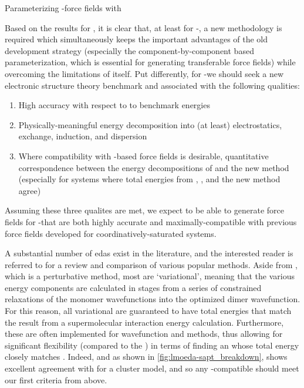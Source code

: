 \begin{section}{Parameterizing \cus-\mof force fields with \lmoeda}
\label{sec:lmoeda-theory}

Based on the results for \mgmof, it is clear that, at least for \cus-\mofs, a
new methodology is required which simultaneously keeps the important advantages of the
old development strategy (especially the component-by-component based parameterization,
which is essential for generating transferable force fields) while overcoming
the limitations of \sapt itself. Put differently, for \cus-\mofs we should
seek a new electronic structure theory benchmark and associated \eda 
with the following qualities:
%
\begin{enumerate}
\item High accuracy with respect to to \ccsdtf benchmark energies
\item Physically-meaningful energy decomposition into (at least)
electrostatics, exchange, induction, and dispersion
\item Where compatibility with \sapt-based force fields is desirable, quantitative correspondence
between the energy decompositions of \sapt and the new method (especially for systems
where total energies from \sapt, \ccsdtf, and the new method agree)
\end{enumerate}
%
Assuming these three qualites are met, we expect to be able to generate force
fields for \cus-\mofs that are both highly accurate and maximally-compatible
with previous force fields developed for coordinatively-saturated \mof
systems. 

A substantial number of \glspl{eda} exist in the literature,
and the interested reader is referred to  for a
review and comparison of various popular methods. Aside from \sapt, which is a
perturbative method, most \edas are `variational', meaning that the
various energy components are calculated in stages from a series of constrained
relaxations of the monomer wavefunctions into the optimized
dimer wavefunction. For this reason, all variational \edas
are guaranteed to have total energies that match the result from a supermolecular
interaction energy calculation. Furthermore, these \edas are often implemented
for wavefunction and \dft methods, thus allowing for significant
flexibility (compared to the \sapt \eda) in terms of finding an \eda whose
total energy closely matches \ccsdtf. Indeed, and 
as shown in
\cref{fig:lmoeda-sapt_breakdown}, \pbeod
shows excellent agreement with \ccsdtf for a \mgmof cluster model, 
and so any \dft-compatible \eda should meet our first criteria from above.


\end{section}
